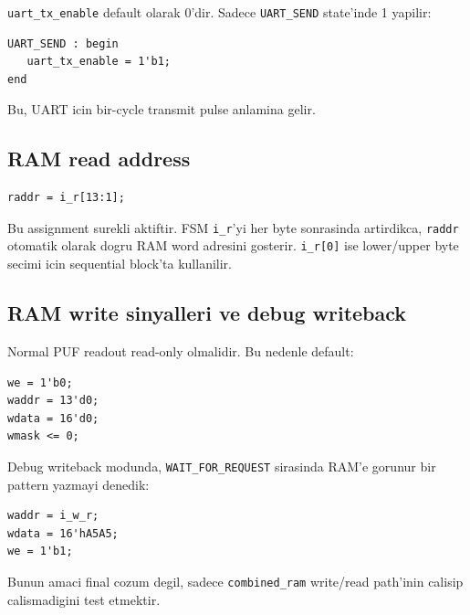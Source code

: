 \documentclass[11pt,a4paper]{article}
\begin{document}
\texttt{uart\_tx\_enable} default olarak 0'dir. Sadece \texttt{UART\_SEND} state'inde 1 yapilir:
\begin{lstlisting}[style=verilogstyle]
UART_SEND : begin
   uart_tx_enable = 1'b1;
end
\end{lstlisting}

Bu, UART icin bir-cycle transmit pulse anlamina gelir.

\subsection{RAM read address}
\begin{lstlisting}[style=verilogstyle]
raddr = i_r[13:1];
\end{lstlisting}

Bu assignment surekli aktiftir. FSM \texttt{i\_r}'yi her byte sonrasinda artirdikca, \texttt{raddr} otomatik olarak dogru RAM word adresini gosterir. \texttt{i\_r[0]} ise lower/upper byte secimi icin sequential block'ta kullanilir.

\subsection{RAM write sinyalleri ve debug writeback}
Normal PUF readout read-only olmalidir. Bu nedenle default:
\begin{lstlisting}[style=verilogstyle]
we = 1'b0;
waddr = 13'd0;
wdata = 16'd0;
wmask <= 0;
\end{lstlisting}

Debug writeback modunda, \texttt{WAIT\_FOR\_REQUEST} sirasinda RAM'e gorunur bir pattern yazmayi denedik:
\begin{lstlisting}[style=verilogstyle]
waddr = i_w_r;
wdata = 16'hA5A5;
we = 1'b1;
\end{lstlisting}

Bunun amaci final cozum degil, sadece \texttt{combined\_ram} write/read path'inin calisip calismadigini test etmektir.
\end{document}
